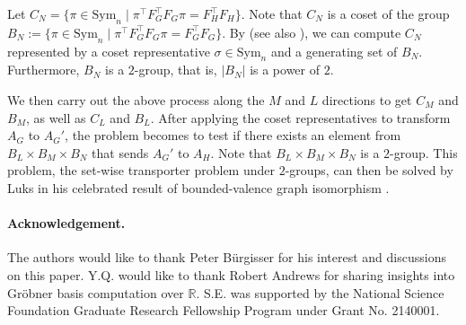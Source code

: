 \documentclass[11pt]{article}
\numberwithin{equation}{section}
\theoremstyle{remark}
\newcommand{\RR}{\mathbb{R}}
\newcommand{\Sym}{\mathrm{Sym}}
\begin{document}
Let $C_N=\{\pi\in \Sym_n\mid \pi^\top F_G^\top F_G \pi=F_H^\top F_H\}$. Note that $C_N$ is a coset of the group $B_N:=\{\pi\in \Sym_n\mid \pi^\top F_G^\top F_G \pi=F_G^\top F_G\}$. By \cite{leighton1979certificates} (see also \cite{spielman2018testing}), we can compute $C_N$ represented by a coset representative $\sigma\in \Sym_n$ and a generating set of $B_N$. Furthermore, $B_N$ is a $2$-group, that is, $|B_N|$ is a power of $2$. 

We then carry out the above process along the $M$ and $L$ directions to get $C_M$ and $B_M$, as well as $C_L$ and $B_L$. After applying the coset representatives to transform $A_G$ to $A_G'$, the problem becomes to test if there exists an element from $B_L\times B_M\times B_N$ that sends $A_G'$ to $A_H$. Note that $B_L\times B_M\times B_N$ is a $2$-group. This problem, the set-wise transporter problem under $2$-groups, can then be solved by Luks in his celebrated result of bounded-valence graph isomorphism \cite{Luks82}.

\paragraph{Acknowledgement.} The authors would like to thank Peter B\"urgisser for his interest and discussions on this paper.
Y.Q. would like to thank Robert Andrews for sharing insights into Gr\"obner basis computation over $\RR$. S.E. was supported by the National Science Foundation Graduate Research Fellowship Program under Grant No. 2140001.




\end{document}
